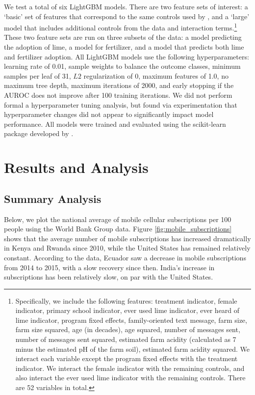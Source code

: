\documentclass[12pt]{article}
\begin{document}
We test a total of six LightGBM models. There are two feature sets of interest: a `basic' set of features that correspond to the same controls used by \textcite{fabregas_digital_2025}, and a `large' model that includes additional controls from the data and interaction terms.\footnote{Specifically, we include the following features: treatment indicator, female indicator, primary school indicator, ever used lime indicator, ever heard of lime indicator, program fixed effects, family-oriented text message, farm size, farm size squared, age (in decades), age squared, number of messages sent, number of messages sent squared, estimated farm acidity (calculated as 7 minus the estimated pH of the farm soil), estimated farm acidity squared. We interact each variable except the program fixed effects with the treatment indicator. We interact the female indicator with the remaining controls, and also interact the ever used lime indicator with the remaining controls. There are 52 variables in total.} These two feature sets are run on three subsets of the data: a model predicting the adoption of lime, a model for fertilizer, and a model that predicts both lime and fertilizer adoption. All LightGBM models use the following hyperparameters: learning rate of 0.01, sample weights to balance the outcome classes, minimum samples per leaf of 31, $L2$ regularization of 0, maximum features of 1.0, no maximum tree depth, maximum iterations of 2000, and early stopping if the AUROC does not improve after 100 training iterations. We did not perform formal a hyperparameter tuning analysis, but found via experimentation that hyperparameter changes did not appear to significantly impact model performance. All models were trained and evaluated using the \textsf{scikit-learn} package developed by \textcite{pedregosa_scikit-learn_2018}.

\section{Results and Analysis}
\label{section:results}
\subsection{Summary Analysis}
Below, we plot the national average of mobile cellular subscriptions per 100 people using the World Bank Group data. Figure \ref{fig:mobile_subscriptions} shows that the average number of mobile subscriptions has increased dramatically in Kenya and Rwanda since 2010, while the United States has remained relatively constant. According to the data, Ecuador saw a decrease in mobile subscriptions from 2014 to 2015, with a slow recovery since then. India's increase in subscriptions has been relatively slow, on par with the United States. 
\end{document}
